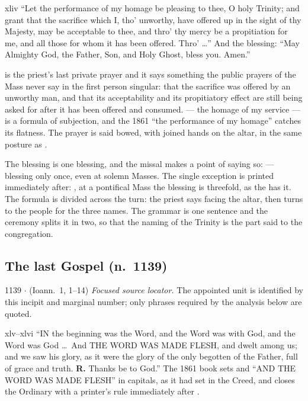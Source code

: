 \begin{englishwitness}{xliv}
``Let the performance of my homage be pleasing to thee, O holy Trinity; and
grant that the sacrifice which I, tho' unworthy, have offered up in the sight
of thy Majesty, may be acceptable to thee, and thro' thy mercy be a propitiation
for me, and all those for whom it has been offered. Thro' \dots'' And the
blessing: ``May Almighty God, the Father, Son, and Holy Ghost, bless you.
Amen.''
\end{englishwitness}

 is the priest's last private prayer and it says something
the public prayers of the Mass never say in the first person singular: that the
sacrifice was offered by an unworthy man, and that its acceptability and its
propitiatory effect are still being asked for after it has been offered and
consumed.  --- the homage of my service ---
is a formula of subjection, and the 1861 ``the performance of my homage''
catches its flatness. The prayer is said bowed, with joined hands on the altar,
in the same posture as .

The blessing is one blessing, and the missal makes a point of saying so:
 --- blessing only
once, even at solemn Masses. The single exception is printed immediately
after: , at a pontifical Mass the blessing is threefold, as the
 has it. The formula is divided across the turn: the priest
says  facing the altar, then turns to
the people for the three names. The grammar is one sentence and the ceremony
splits it in two, so that the naming of the Trinity is the part said to the
congregation.

\subsection*{The last Gospel (n.~1139)}

\begin{appointed}{1139 $\cdot$  (Ioann.~1, 1--14)}
\textit{Focused source locator.} The appointed unit is identified by this incipit and marginal number; only phrases required by the analysis below are quoted.
\end{appointed}

\begin{englishwitness}{xlv--xlvi}
``IN the beginning was the Word, and the Word was with God, and the Word was
God \dots\ And THE WORD WAS MADE FLESH, and dwelt among us; and we saw his
glory, as it were the glory of the only begotten of the Father, full of grace
and truth. \textbf{R.} Thanks be to God.'' The 1861 book sets  and ``AND THE WORD WAS MADE FLESH'' in capitals, as it
had set  in the Creed, and closes the Ordinary
with a printer's rule immediately after .
\end{englishwitness}

